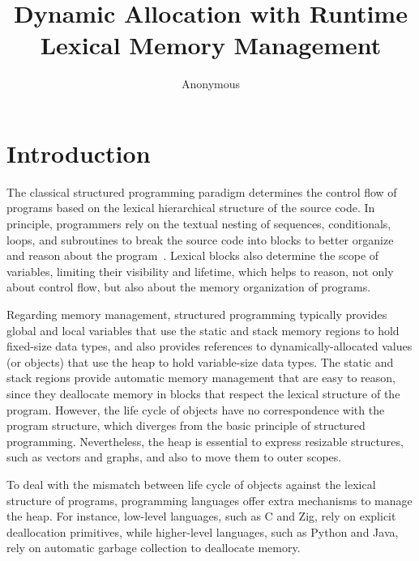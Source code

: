 \documentclass[12pt]{article}
\title {
    Dynamic Allocation with Runtime Lexical Memory Management
}
\author{Anonymous}
\begin{document}
\maketitle

\begin{abstract}
\end{abstract}


\section{Introduction}
\label{sec.intro}

The classical structured programming paradigm determines the control flow of
programs based on the lexical hierarchical structure of the source code.
%
In principle, programmers rely on the textual nesting of sequences,
conditionals, loops, and subroutines to break the source code into blocks to
better organize and reason about the program~\cite{TODO}.
%
Lexical blocks also determine the scope of variables, limiting their visibility
and lifetime, which helps to reason, not only about control flow, but also
about the memory organization of programs.

Regarding memory management, structured programming typically provides global
and local variables that use the static and stack memory regions to hold
fixed-size data types, and also provides references to dynamically-allocated
values (or objects) that use the heap to hold variable-size data types.
%
The static and stack regions provide automatic memory management that are easy
to reason, since they deallocate memory in blocks that respect the lexical
structure of the program.
%
However, the life cycle of objects have no correspondence with the program
structure, which diverges from the basic principle of structured programming.
%
Nevertheless, the heap is essential to express resizable structures, such as
vectors and graphs, and also to move them to outer scopes.

To deal with the mismatch between life cycle of objects against the lexical
structure of programs, programming languages offer extra mechanisms to manage
the heap.
%
For instance, low-level languages, such as C and Zig, rely on explicit
deallocation primitives, while higher-level languages, such as Python and Java,
rely on automatic garbage collection to deallocate memory.
\end{document}
